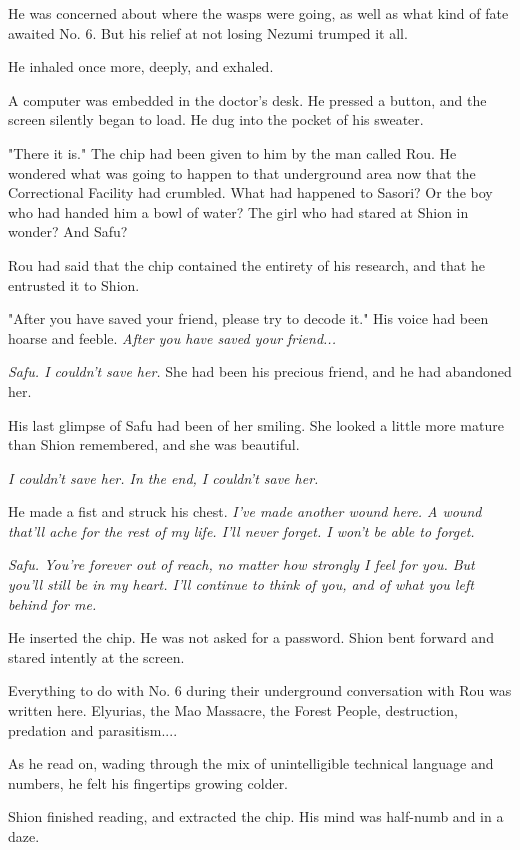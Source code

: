 He was concerned about where the wasps were going, as well as what kind
of fate awaited No. 6. But his relief at not losing Nezumi trumped it
all.

He inhaled once more, deeply, and exhaled.

A computer was embedded in the doctor's desk. He pressed a button, and
the screen silently began to load. He dug into the pocket of his
sweater.

"There it is." The chip had been given to him by the man called Rou. He
wondered what was going to happen to that underground area now that the
Correctional Facility had crumbled. What had happened to Sasori? Or the
boy who had handed him a bowl of water? The girl who had stared at Shion
in wonder? And Safu?

Rou had said that the chip contained the entirety of his research, and
that he entrusted it to Shion.

"After you have saved your friend, please try to decode it." His voice
had been hoarse and feeble. \emph{After you have saved your friend...}

\emph{Safu. I couldn't save her.} She had been his precious friend, and he had
abandoned her.

His last glimpse of Safu had been of her smiling. She looked a little
more mature than Shion remembered, and she was beautiful.

\emph{I couldn't save her. In the end, I couldn't save her.}

He made a fist and struck his chest. \emph{I've made another wound here. A
wound that'll ache for the rest of my life. I'll never forget. I won't
be able to forget.}

\emph{Safu. You're forever out of reach, no matter how strongly I feel for
you. But you'll still be in my heart. I'll continue to think of you, and
of what you left behind for me.}

He inserted the chip. He was not asked for a password. Shion bent
forward and stared intently at the screen.

Everything to do with No. 6 during their underground conversation with
Rou was written here. Elyurias, the Mao Massacre, the Forest People,
destruction, predation and parasitism....

As he read on, wading through the mix of unintelligible technical
language and numbers, he felt his fingertips growing colder.

Shion finished reading, and extracted the chip. His mind was half-numb
and in a daze.


